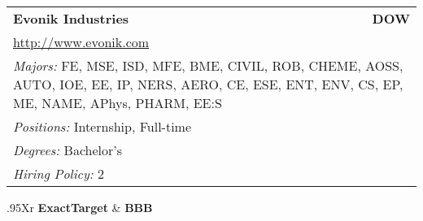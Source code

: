 \documentclass[twoside]{article}
\begin{document}
\begin{center}
\begin{multicols}{3}
\begin{FlushLeft}
\begin{minipage}{\columnwidth}
\end{minipage}
 
\begin{minipage}{\columnwidth}\begin{tabularx}{.95\columnwidth}{Xr}
                 {\Large\bf Evonik Industries} & {\Large\bf DOW}\\
    \multicolumn{2}{p{.95\columnwidth}}{\url{http://www.evonik.com}}\\
    \multicolumn{2}{p{.95\columnwidth}}{\emph{Majors:} FE, MSE, ISD, MFE, BME, CIVIL, ROB, CHEME, AOSS, AUTO, IOE, EE, IP, NERS, AERO, CE, ESE, ENT, ENV, CS, EP, ME, NAME, APhys, PHARM, EE:S}\\
    \multicolumn{2}{p{.95\columnwidth}}{\emph{Positions:} Internship, Full-time}\\
    \multicolumn{2}{p{.95\columnwidth}}{\emph{Degrees:} Bachelor's}\\
    \multicolumn{2}{p{.95\columnwidth}}{\emph{Hiring Policy:} 2}\\
    \end{tabularx}
    
\end{minipage}
 
\begin{minipage}{\columnwidth}\begin{tabularx}{.95\columnwidth}{Xr}
                 {\Large\bf ExactTarget} & {\Large\bf BBB}\\
    \\
    \\
    \\
    \\
    \\
    \end{tabularx}
    
\end{minipage}
 

\end{FlushLeft}
\end{multicols}
\end{center}
\end{document}
